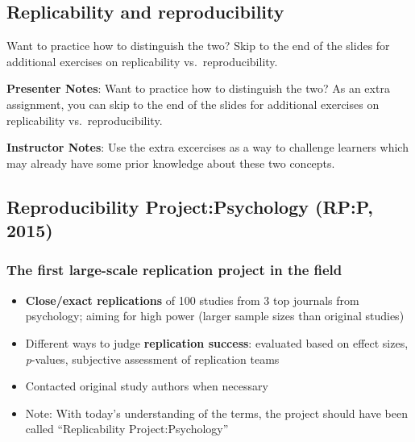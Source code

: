 \documentclass[
  letterpaper,
  DIV=11,
  numbers=noendperiod]{scrartcl}
\providecommand{\tightlist}{%
  \setlength{\itemsep}{0pt}\setlength{\parskip}{0pt}}
\begin{document}
\subsection{Replicability and
reproducibility}\label{replicability-and-reproducibility-1}

\begin{tcolorbox}[enhanced jigsaw, arc=.35mm, bottomrule=.15mm, bottomtitle=1mm, breakable, colback=white, colbacktitle=quarto-callout-tip-color!10!white, colframe=quarto-callout-tip-color-frame, coltitle=black, left=2mm, leftrule=.75mm, opacityback=0, opacitybacktitle=0.6, rightrule=.15mm, title=\textcolor{quarto-callout-tip-color}{\faLightbulb}\hspace{0.5em}{Additional exercises}, titlerule=0mm, toprule=.15mm, toptitle=1mm]

Want to practice how to distinguish the two? Skip to the end of the
slides for additional exercises on replicability vs.~reproducibility.

\end{tcolorbox}

\textbf{Presenter Notes}: Want to practice how to distinguish the two?
As an extra assignment, you can skip to the end of the slides for
additional exercises on replicability vs.~reproducibility.

\textbf{Instructor Notes}: Use the extra excercises as a way to
challenge learners which may already have some prior knowledge about
these two concepts.

\subsection{Reproducibility Project:Psychology (RP:P,
2015)}\label{reproducibility-projectpsychology-rpp-2015}

\subsubsection{The first large-scale replication project in the
field}\label{the-first-large-scale-replication-project-in-the-field}

\begin{itemize}
\tightlist
\item
  \textbf{Close/exact replications} of 100 studies from 3 top journals
  from psychology; aiming for high power (larger sample sizes than
  original studies)
\item
  Different ways to judge \textbf{replication success}: evaluated based
  on effect sizes, \emph{p}-values, subjective assessment of replication
  teams
\item
  Contacted original study authors when necessary
\item
  {Note: With today's understanding of the terms, the project should
  have been called ``Replicability Project:Psychology''}
\end{itemize}
\end{document}
